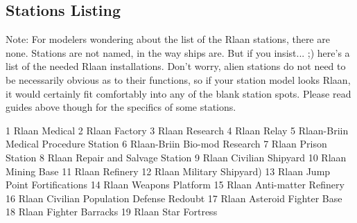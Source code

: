 \subsection{Stations Listing}

Note: For modelers wondering about the list of the Rlaan stations, there are none. Stations are not named, in the way ships are. But if you insist... ;) here's a list of the needed Rlaan installations. Don't worry, alien stations do not need to be necessarily obvious as to their functions, so if your station model looks Rlaan, it would certainly fit comfortably into any of the blank station spots. Please read guides above though for the specifics of some stations.

    1 Rlaan Medical
    2 Rlaan Factory
    3 Rlaan Research
    4 Rlaan Relay
    5 Rlaan-Briin Medical Procedure Station
    6 Rlaan-Briin Bio-mod Research
    7 Rlaan Prison Station
    8 Rlaan Repair and Salvage Station
    9 Rlaan Civilian Shipyard
    10 Rlaan Mining Base
    11 Rlaan Refinery
    12 Rlaan Military Shipyard)
    13 Rlaan Jump Point Fortifications
    14 Rlaan Weapons Platform
    15 Rlaan Anti-matter Refinery
    16 Rlaan Civilian Population Defense Redoubt
    17 Rlaan Asteroid Fighter Base
    18 Rlaan Fighter Barracks
    19 Rlaan Star Fortress


